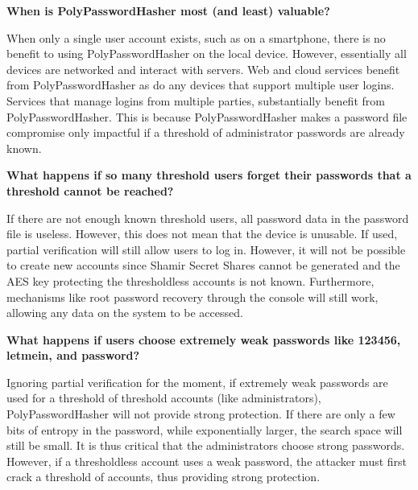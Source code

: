 {\bf When is PolyPasswordHasher most (and least) valuable?}

When only a single user account exists, such as on a smartphone, 
there is no benefit to using PolyPasswordHasher on the local device.   However, 
essentially all devices are networked and interact with servers.   Web and 
cloud services benefit from PolyPasswordHasher as do any devices that support
multiple user logins.   
Services that manage logins from multiple parties, substantially benefit from
PolyPasswordHasher.     This is because PolyPasswordHasher makes 
a password file compromise only impactful if a threshold of administrator
passwords are already known.   %


{\bf What happens if so many threshold users forget their passwords that a
threshold cannot be reached?}

If there are not enough known threshold users, all password data in the
password file is useless.   However, this does not mean that the device is
unusable.   If used, partial verification will still allow users to log in.   
However, it will not be possible to create new accounts since Shamir
Secret Shares cannot be generated and the AES key protecting the thresholdless
accounts is not known.  Furthermore, mechanisms like root password recovery 
through
the console will still work, allowing any data on the system to be accessed.




%



{\bf What happens if users choose extremely weak passwords like 123456, 
letmein, and password?}

Ignoring partial verification for the moment, 
if extremely weak passwords are used for a threshold of threshold accounts 
(like administrators), PolyPasswordHasher will not provide strong protection.   If
there are only a few bits of entropy in the password, while exponentially
larger, the search space will still be small.   It is thus critical that
the administrators choose strong passwords.   However,
if a thresholdless account uses a weak password, the attacker must first
crack a threshold of accounts, thus providing strong protection.


